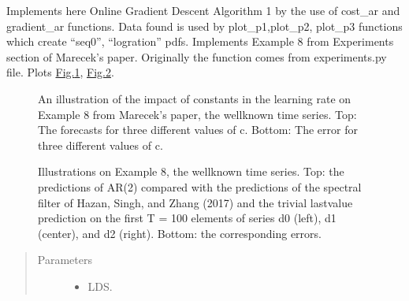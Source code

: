 \documentclass[letterpaper,10pt,english]{sphinxmanual}
\begin{document}
\begin{fulllineitems}
\label{\detokenize{LDS:LDS.OnlineLDS_library.test_identification}}
\sphinxAtStartPar
Implements here On\sphinxhyphen{}line Gradient Descent Algorithm 1 by the use of cost\_ar and gradient\_ar
functions.
Data found is used by plot\_p1,plot\_p2, plot\_p3 functions which create “seq0”, “logration” pdfs.
Implements Example 8 from Experiments section of Marecek’s paper.
Originally the function comes from experiments.py file. Plots \hyperref[\detokenize{LDS:fig7}]{Fig.\@ \ref{\detokenize{LDS:fig7}}}, \hyperref[\detokenize{LDS:fig8}]{Fig.\@ \ref{\detokenize{LDS:fig8}}}.

\begin{figure}[htbp]
\centering
\capstart

\noindent{}
\caption{An illustration of the impact of constants in the learning rate on
Example 8 from Marecek’s paper, the well\sphinxhyphen{}known time series.
Top: The forecasts for three different values of c.
Bottom: The error for three different values of c.}\label{\detokenize{LDS:id4}}\label{\detokenize{LDS:fig7}}\end{figure}

\begin{figure}[htbp]
\centering
\capstart

\noindent{}
\caption{Illustrations on Example 8, the well\sphinxhyphen{}known time series. Top: the
predictions of AR(2) compared with the predictions of the spectral filter of
Hazan, Singh, and Zhang (2017) and the trivial last\sphinxhyphen{}value prediction on the
first T = 100 elements of series d0 (left), d1 (center), and d2 (right).
Bottom: the corresponding errors.}\label{\detokenize{LDS:id5}}\label{\detokenize{LDS:fig8}}\end{figure}
\begin{quote}\begin{description}
\item[{Parameters}] \leavevmode\begin{itemize}
\item {} 
\sphinxAtStartPar
{} \textendash{} LDS.


\end{itemize}
\end{description}
\end{quote}
\end{fulllineitems}
\end{document}
